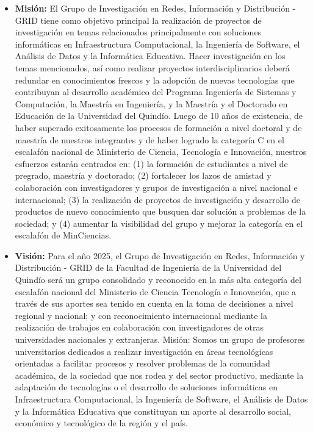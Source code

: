 \begin{itemize}
    \item \textbf{Misión:} El Grupo de Investigación en Redes, Información y Distribución - GRID tiene como objetivo principal la realización de proyectos de investigación en temas relacionados principalmente con soluciones informáticas en Infraestructura Computacional, la Ingeniería de Software, el Análisis de Datos y la Informática Educativa. Hacer investigación en los temas mencionados, así como realizar proyectos interdisciplinarios deberá redundar en conocimientos frescos y la adopción de nuevas tecnologías que contribuyan al desarrollo académico del Programa Ingeniería de Sistemas y Computación, la Maestría en Ingeniería, y la Maestría y el Doctorado en Educación de la Universidad del Quindío. Luego de 10 años de existencia, de haber superado exitosamente los procesos de formación a nivel doctoral y de maestría de nuestros integrantes y de haber logrado la categoría C en el escalafón nacional de Ministerio de Ciencia, Tecnología e Innovación, nuestros esfuerzos estarán centrados en: (1) la formación de estudiantes a nivel de pregrado, maestría y doctorado; (2) fortalecer los lazos de amistad y colaboración con investigadores y grupos de investigación a nivel nacional e internacional; (3) la realización de proyectos de investigación y desarrollo de productos de nuevo conocimiento que busquen dar solución a problemas de la sociedad; y (4) aumentar la visibilidad del grupo y mejorar la categoría en el escalafón de MinCiencias.
    \item \textbf{Visión:} Para el año 2025, el Grupo de Investigación en Redes, Información y Distribución - GRID de la Facultad de Ingeniería de la Universidad del Quindío será un grupo consolidado y reconocido en la más alta categoría del escalafón nacional del Ministerio de Ciencia Tecnología e Innovación, que a través de sus aportes sea tenido en cuenta en la toma de decisiones a nivel regional y nacional; y con reconocimiento internacional mediante la realización de trabajos en colaboración con investigadores de otras universidades nacionales y extranjeras. Misión: Somos un grupo de profesores universitarios dedicados a realizar investigación en áreas tecnológicas orientadas a facilitar procesos y resolver problemas de la comunidad académica, de la sociedad que nos rodea y del sector productivo, mediante la adaptación de tecnologías o el desarrollo de soluciones informáticas en Infraestructura Computacional, la Ingeniería de Software, el Análisis de Datos y la Informática Educativa que constituyan un aporte al desarrollo social, económico y tecnológico de la región y el país.

\end{itemize}
